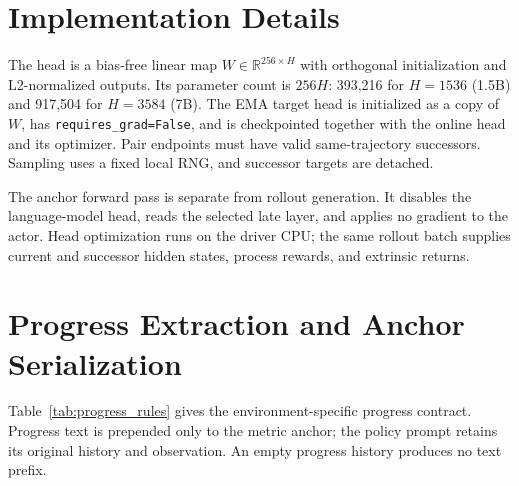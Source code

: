 
\section{Implementation Details}
\label{app:algorithm}

The head is a bias-free linear map $W\in\mathbb R^{256\times H}$ with orthogonal initialization and L2-normalized outputs. Its parameter count is $256H$: 393,216 for $H=1536$ (1.5B) and 917,504 for $H=3584$ (7B). The EMA target head is initialized as a copy of $W$, has \texttt{requires\_grad=False}, and is checkpointed together with the online head and its optimizer. Pair endpoints must have valid same-trajectory successors. Sampling uses a fixed local RNG, and successor targets are detached.

The anchor forward pass is separate from rollout generation. It disables the language-model head, reads the selected late layer, and applies no gradient to the actor. Head optimization runs on the driver CPU; the same rollout batch supplies current and successor hidden states, process rewards, and extrinsic returns.

\section{Progress Extraction and Anchor Serialization}
\label{app:progress}

Table~\ref{tab:progress_rules} gives the environment-specific progress contract. Progress text is prepended only to the metric anchor; the policy prompt retains its original history and observation. An empty progress history produces no text prefix.

